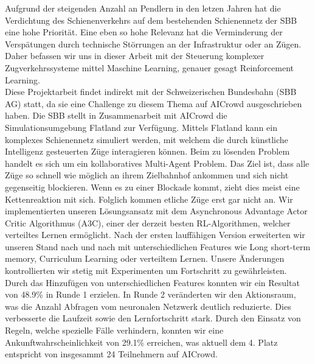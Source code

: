 Aufgrund der steigenden Anzahl an Pendlern in den letzen Jahren hat die Verdichtung des Schienenverkehrs auf dem bestehenden Schienennetz der SBB eine hohe Priorität.
Eine eben so hohe Relevanz hat die Verminderung der Verspätungen durch technische Störrungen an der Infrastruktur oder an Zügen.
Daher befassen wir uns in dieser Arbeit mit der Steuerung komplexer Zugverkehrssysteme mittel Maschine Learning, genauer gesagt Reinforcement Learning.\\
Diese Projektarbeit findet indirekt mit der Schweizerischen Bundesbahn (SBB AG) statt, da sie eine Challenge zu diesem Thema auf AICrowd ausgeschrieben haben.
Die SBB stellt in Zusammenarbeit mit AICrowd die Simulationsumgebung Flatland zur Verfügung. Mittels Flatland kann ein komplexes Schienennetz simuliert werden, mit welchem die durch künstliche Intelligenz gesteuerten Züge interagieren können.
Beim zu lösenden Problem handelt es sich um ein kollaboratives Multi-Agent Problem. Das Ziel ist, dass alle Züge so schnell wie möglich an ihrem Zielbahnhof ankommen und sich nicht gegenseitig blockieren. Wenn es zu einer Blockade kommt, zieht dies meist eine Kettenreaktion mit sich. Folglich kommen etliche Züge erst gar nicht an.
Wir implementierten unseren Lösungsansatz mit dem Asynchronous Advantage Actor Critic Algorithmus (A3C), einer der derzeit besten RL-Algorithmen, welcher verteiltes Lernen ermöglicht.
Nach der ersten lauffähigen Version erweiterten wir unseren Stand nach und nach mit unterschiedlichen Features wie Long short-term memory, Curriculum Learning oder verteiltem Lernen.
Unsere Änderungen kontrollierten wir stetig mit Experimenten um Fortschritt zu gewährleisten.
Durch das Hinzufügen von unterschiedlichen Features konnten wir ein Resultat von 48.9\% in Runde 1 erzielen.
In Runde 2 veränderten wir den Aktionsraum, was die Anzahl Abfragen vom neuronalen Netzwerk deutlich reduzierte. Dies verbesserte die Laufzeit sowie den Lernfortschritt stark.
Durch den Einsatz von Regeln, welche spezielle Fälle verhindern, konnten wir eine Ankunftwahrscheinlichkeit von 29.1\% erreichen, was aktuell dem 4. Platz entspricht von insgesammt 24 Teilnehmern auf AICrowd.
\newpage
\thispagestyle{empty}
